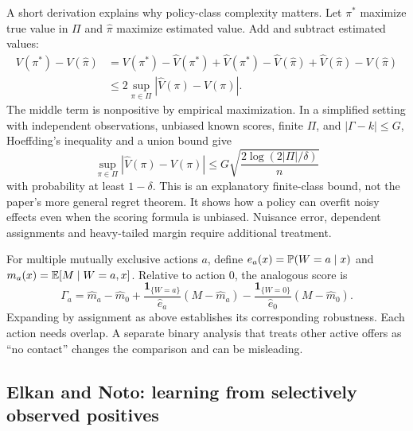 A short derivation explains why policy-class complexity matters. Let $\pi^*$ maximize true value in $\Pi$ and $\widehat\pi$ maximize estimated value. Add and subtract estimated values:
\begin{align*}
 V(\pi^*)-V(\widehat\pi)
 &=V(\pi^*)-\widehat V(\pi^*)
 +\widehat V(\pi^*)-\widehat V(\widehat\pi)
 +\widehat V(\widehat\pi)-V(\widehat\pi)\\
 &\le 2\sup_{\pi\in\Pi}|\widehat V(\pi)-V(\pi)|.
\end{align*}
The middle term is nonpositive by empirical maximization. In a simplified setting with independent observations, unbiased known scores, finite $\Pi$, and $|\Gamma-k|\le G$, Hoeffding's inequality and a union bound give
\[
 \sup_{\pi\in\Pi}|\widehat V(\pi)-V(\pi)|
 \le G\sqrt{\frac{2\log(2|\Pi|/\delta)}{n}}
\]
with probability at least $1-\delta$. This is an explanatory finite-class bound, not the paper's more general regret theorem. It shows how a policy can overfit noisy effects even when the scoring formula is unbiased. Nuisance error, dependent assignments and heavy-tailed margin require additional treatment.

For multiple mutually exclusive actions $a$, define $e_a(x)=\mathbb{P}(W=a\mid x)$ and $m_a(x)=\mathbb{E}[M\mid W=a,x]$. Relative to action $0$, the analogous score is
\[
 \Gamma_a=\widehat m_a-\widehat m_0
 +\frac{\mathbf1_{\{W=a\}}}{\widehat e_a}(M-\widehat m_a)
 -\frac{\mathbf1_{\{W=0\}}}{\widehat e_0}(M-\widehat m_0).
\]
Expanding by assignment as above establishes its corresponding robustness. Each action needs overlap. A separate binary analysis that treats other active offers as ``no contact'' changes the comparison and can be misleading.

\subsection{Elkan and Noto: learning from selectively observed positives}

